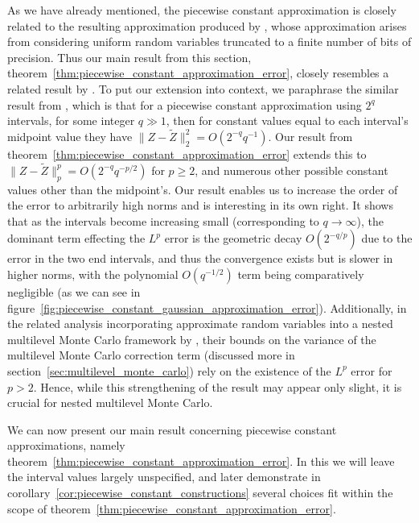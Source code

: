 \documentclass[manuscript,review]{acmart}
\begin{document}
As we have already mentioned, the piecewise constant approximation is closely related to the resulting approximation produced by \citet{giles2019random_quadrature}, whose approximation arises from considering uniform random variables truncated to a finite number of bits of precision. Thus our main result from this section, theorem~\ref{thm:piecewise_constant_approximation_error}, closely resembles a related result by \citet[theorem~1]{giles2019random_quadrature}. To put our extension into context, we paraphrase the similar result from \citet{giles2019random_quadrature}, which is that for a piecewise constant approximation using $ 2^q $ intervals, for some integer $ q \gg 1 $, then for constant values equal to each interval's midpoint value they have $ \lVert Z - \widetilde{Z}\rVert_2^2 = O(2^{-q}q^{-1}) $. Our result from theorem~\ref{thm:piecewise_constant_approximation_error} extends this to $ \lVert Z - \widetilde{Z}\rVert_p^p = O(2^{-q} q^{-p/2}) $ for $ p \geq 2 $, and numerous other possible constant values other than the midpoint's. Our result enables us to increase the order of the error to arbitrarily high norms and is interesting in its own right. It shows that as the intervals become increasing small (corresponding to $ q \to \infty $), the dominant term effecting the $ L^p $ error is the geometric decay $ O(2^{-q/p}) $ due to the error in the two end intervals, and thus the convergence exists but is slower in higher norms, with the polynomial $ O(q^{-1/2}) $ term being comparatively negligible (as we can see in figure~\ref{fig:piecewise_constant_gaussian_approximation_error}). Additionally, in the related analysis incorporating approximate random variables into a nested multilevel Monte Carlo framework by \citeauthor{giles2020approximate} \citep{giles2020approximate,sheridan2020nested}, their bounds on the variance of the multilevel Monte Carlo correction term (discussed more in section~\ref{sec:multilevel_monte_carlo}) rely on the existence of the $ L^p $ error for $ p > 2 $. Hence, while this strengthening of the result may appear only slight, it is crucial for nested multilevel Monte Carlo. 

We can now present our main result concerning piecewise constant approximations, namely theorem~\ref{thm:piecewise_constant_approximation_error}. In this we will leave the interval values largely unspecified, and later demonstrate in corollary~\ref{cor:piecewise_constant_constructions} several choices fit within the scope of theorem~\ref{thm:piecewise_constant_approximation_error}.
\end{document}
